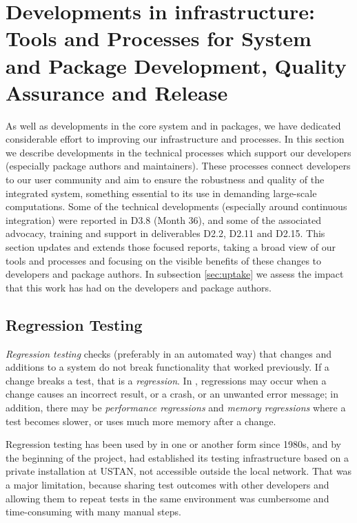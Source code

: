 \section{Developments in \GAP infrastructure: Tools and Processes for
  System and Package Development, Quality Assurance and Release }\label{sec:gap-infra}

As well as developments in the core system and in packages, we have
dedicated considerable effort to improving our infrastructure and
processes.  In this section we describe developments in the technical
processes which support our developers (especially package
authors and maintainers). 
These processes connect developers to our user community and aim to ensure the
robustness and quality of the integrated system, something essential
to its use in demanding large-scale computations. Some of the
technical developments (especially around continuous integration) were
reported in D3.8 (Month 36), and some of the associated advocacy,
training and support in deliverables D2.2, D2.11 and D2.15. This
section updates and extends those focused reports, taking a broad
view of our tools and processes and focusing on the visible benefits
of these changes to developers and package authors. In subsection
\ref{sec:uptake} we assess the impact that this work has
had on the developers and package authors.

\subsection{Regression Testing}\label{testing}

\emph{Regression testing} %
checks (preferably in an automated way)
that changes and additions to a system do not break functionality that 
worked previously. If a change breaks a test, that is 
a \emph{regression}. In \GAP, regressions may occur
when a change causes an incorrect result, or a crash, or an unwanted error
message; in addition, there may be \emph{performance regressions}
and \emph{memory regressions} where a test becomes slower, or uses
much more memory after a change.

Regression testing has been used by \GAP in one or another form since 
1980s, and by the beginning of the \ODK project, \GAP had established its testing infrastructure
based on a private \href{https://jenkins.io/} installation
at USTAN, not accessible outside the local network. That was a major limitation,
because sharing test outcomes with other developers and
allowing them to repeat tests in the same environment was cumbersome
and time-consuming with many manual steps.

